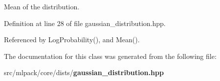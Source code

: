 Mean of the distribution. 



Definition at line 28 of file gaussian\+\_\+distribution.\+hpp.



Referenced by Log\+Probability(), and Mean().



The documentation for this class was generated from the following file\+:\begin{DoxyCompactItemize}
\item 
src/mlpack/core/dists/{\bf gaussian\+\_\+distribution.\+hpp}\end{DoxyCompactItemize}
